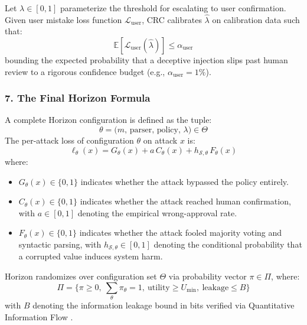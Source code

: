 Let $\lambda \in [0, 1]$ parameterize the threshold for escalating to user confirmation. Given user mistake loss function $\mathcal{L}_{\mathrm{user}}$, CRC calibrates $\hat{\lambda}$ on calibration data such that:
\begin{equation}
    \mathbb{E}\left[\mathcal{L}_{\mathrm{user}}(\hat{\lambda})\right] \le \alpha_{\mathrm{user}}
\end{equation}
bounding the expected probability that a deceptive injection slips past human review to a rigorous confidence budget (e.g., $\alpha_{\mathrm{user}} = 1\%$).

\subsubsection{7. The Final Horizon Formula}
A complete Horizon configuration is defined as the tuple:
\begin{equation}
    \theta = \big(m,\, \text{parser},\, \text{policy},\, \lambda\big) \in \Theta
\end{equation}
The per-attack loss of configuration $\theta$ on attack $x$ is:
\begin{equation}
    \ell_\theta(x) = G_\theta(x) + a\,C_\theta(x) + h_{\mathcal{S},\theta}\,F_\theta(x)
\end{equation}
where:
\begin{itemize}
    \item $G_\theta(x) \in \{0, 1\}$ indicates whether the attack bypassed the policy entirely.
    \item $C_\theta(x) \in \{0, 1\}$ indicates whether the attack reached human confirmation, with $a \in [0, 1]$ denoting the empirical wrong-approval rate.
    \item $F_\theta(x) \in \{0, 1\}$ indicates whether the attack fooled majority voting and syntactic parsing, with $h_{\mathcal{S},\theta} \in [0, 1]$ denoting the conditional probability that a corrupted value induces system harm.
\end{itemize}

Horizon randomizes over configuration set $\Theta$ via probability vector $\pi \in \Pi$, where:
\begin{equation}
    \Pi = \Big\{\pi \ge 0, \ \textstyle\sum_\theta \pi_\theta = 1, \ \text{utility} \ge U_{\min}, \ \text{leakage} \le B\Big\}
\end{equation}
with $B$ denoting the information leakage bound in bits verified via Quantitative Information Flow \cite{smith2009qif}.

